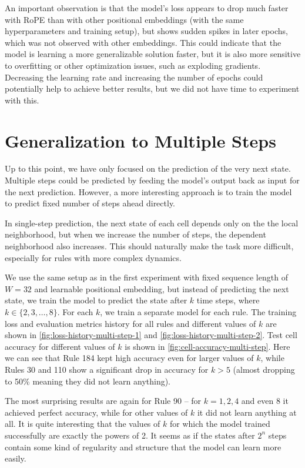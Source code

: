 \documentclass[runningheads]{llncs}
\begin{document}
An important observation is that the model's loss appears to drop much faster with RoPE than with other positional embeddings (with the same hyperparameters and training setup), but shows sudden spikes in later epochs, which was not observed with other embeddings. This could indicate that the model is learning a more generalizable solution faster, but it is also more sensitive to overfitting or other optimization issues, such as exploding gradients. Decreasing the learning rate and increasing the number of epochs could potentially help to achieve better results, but we did not have time to experiment with this.


\section{Generalization to Multiple Steps}
\label{sec:multi-step}

Up to this point, we have only focused on the prediction of the very next state. Multiple steps could be predicted by feeding the model's output back as input for the next prediction. However, a more interesting approach is to train the model to predict fixed number of steps ahead directly.

In single-step prediction, the next state of each cell depends only on the the local neighborhood, but when we increase the number of steps, the dependent neighborhood also increases. This should naturally make the task more difficult, especially for rules with more complex dynamics.

We use the same setup as in the first experiment with fixed sequence length of $W = 32$ and learnable positional embedding, but instead of predicting the next state, we train the model to predict the state after $k$ time steps, where $k \in \{ 2, 3, \dots, 8 \}$. For each $k$, we train a separate model for each rule. The training loss and evaluation metrics history for all rules and different values of $k$ are shown in \cref{fig:loss-history-multi-step-1} and \cref{fig:loss-history-multi-step-2}. Test cell accuracy for different values of $k$ is shown in \cref{fig:cell-accuracy-multi-step}. Here we can see that Rule 184 kept high accuracy even for larger values of $k$, while Rules 30 and 110 show a significant drop in accuracy for $k > 5$ (almost dropping to 50\% meaning they did not learn anything).

The most surprising results are again for Rule 90 -- for $k = 1, 2, 4$ and even $8$ it achieved perfect accuracy, while for other values of $k$ it did not learn anything at all. It is quite interesting that the values of $k$ for which the model trained successfully are exactly the powers of 2. It seems as if the states after $2^n$ steps contain some kind of regularity and structure that the model can learn more easily.
\end{document}
